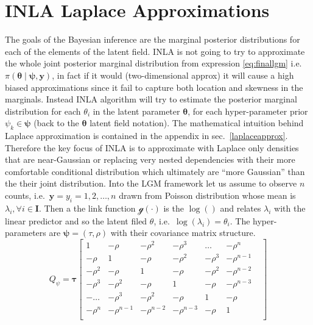 \documentclass[
  12pt,
  a4paper,
  oneside]{book}
\theoremstyle{definition}
\theoremstyle{definition}
\theoremstyle{definition}
\theoremstyle{remark}
\begin{document}
\hypertarget{approx}{%
\section{INLA Laplace Approximations}\label{approx}}

The goals of the Bayesian inference are the marginal posterior distributions for each of the elements of the latent field. INLA is not going to try to approximate the whole joint posterior marginal distribution from expression \eqref{eq:finallgm} i.e.~\(\pi(\boldsymbol{\theta} \mid \boldsymbol{\psi}, \boldsymbol{\mathbf{y}})\), in fact if it would (two-dimensional approx) it will cause a high biased approximations since it fail to capture both location and skewness in the marginals. Instead INLA algorithm will try to estimate the posterior marginal distribution for each \(\theta_{i}\) in the latent parameter \(\boldsymbol{\theta}\), for each hyper-parameter prior \(\psi_{k} \in \boldsymbol\psi\) (back to the \(\boldsymbol\theta\) latent field notation). The mathematical intuition behind Laplace approximation is contained in the appendix in sec.~\ref{laplaceapprox}.
Therefore the key focus of INLA is to approximate with Laplace only densities that are near-Gaussian \citeyearpar{wang2018bayesian} or replacing very nested dependencies with their more comfortable conditional distribution which ultimately are ``more Gaussian'' than the their joint distribution.
Into the LGM framework let us assume to observe \(n\) counts, i.e.~\(\mathbf{y} = y_i = 1,2, \ldots, n\) drawn from Poisson distribution whose mean is \(\lambda_i, \forall i \in \mathbf{I}\). Then a the link function \(\mathscr{g}(\cdot)\) is the \(\log()\) and relates \(\lambda_i\) with the linear predictor and so the latent filed \(\theta\), i.e.~\(\log(\lambda_i)=\theta_{i}\). The hyper-parameters are \(\boldsymbol\psi = (\tau, \rho)\) with their covariance matrix structure.
\[
Q_{\psi}=\boldsymbol\tau\begin{bmatrix}
1 & - \rho & - \rho^{2} & - \rho^{3} & \ldots & - \rho^{n} &  \\
- \rho & 1 & - \rho & - \rho^{2} & - \rho^{3} & - \rho^{n-1} & \\
- \rho^{2} & - \rho & 1 & - \rho & - \rho^{2} & - \rho^{n-2} &  \\
- \rho^{3} & - \rho^{2} & - \rho & 1 & - \rho & - \rho^{n-3} &  \\
- \ldots & - \rho^{3} & - \rho^{2} & - \rho & 1 & - \rho &  \\
- \rho^{n} & - \rho^{n-1} & - \rho^{n-2} & - \rho^{n-3} & - \rho & 1 \\
\end{bmatrix}
\]
\end{document}
